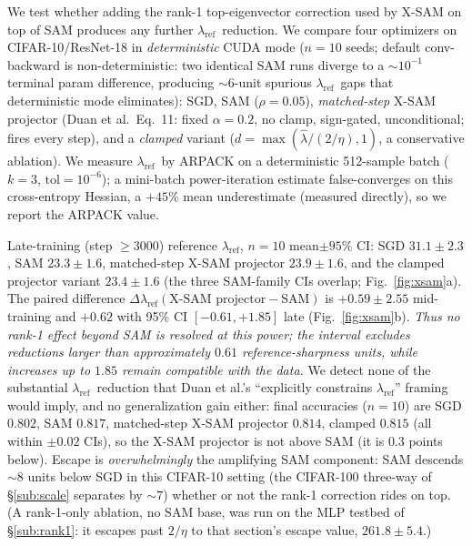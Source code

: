 \documentclass{article}
\theoremstyle{plain}
\theoremstyle{definition}
\theoremstyle{remark}
\newcommand{\lref}{\ensuremath{\lambda_{\mathrm{ref}}}}
\begin{document}
We test whether adding the rank-1 top-eigenvector correction used by X-SAM
\citep{duan2026xsam} on top of SAM produces any further \lref\
reduction. We compare four optimizers on CIFAR-10/ResNet-18 in
\emph{deterministic} CUDA mode ($n{=}10$ seeds; default conv-backward is
non-deterministic: two identical SAM runs diverge to a $\sim\!10^{-1}$
terminal param difference, producing $\sim\!6$-unit spurious \lref\ gaps
that deterministic mode eliminates): SGD, SAM ($\rho{=}0.05$),
\emph{matched-step} X-SAM projector (Duan et al.\ Eq.~11: fixed $\alpha{=}0.2$, no
clamp, sign-gated, unconditional; fires every step), and a \emph{clamped}
variant ($d=\max(\hat\lambda/(2/\eta),1)$, a conservative ablation). We
measure \lref\ by ARPACK on a deterministic 512-sample batch ($k{=}3$,
$\mathrm{tol}{=}10^{-6}$); a mini-batch power-iteration estimate
false-converges on this cross-entropy Hessian, a $+45\%$ mean
underestimate (measured directly), so we report the ARPACK value.

Late-training (step $\geq 3000$) reference \lref, $n{=}10$ mean$\pm 95\%$ CI:
SGD $31.1\pm2.3$, SAM $23.3\pm1.6$, matched-step X-SAM projector
$23.9\pm1.6$, and the clamped projector variant $23.4\pm1.6$ (the three
SAM-family CIs overlap; Fig.~\ref{fig:xsam}a). The paired difference
$\Delta\lref(\text{X-SAM projector}-\text{SAM})$ is $+0.59\pm2.55$
mid-training and $+0.62$ with 95\% CI $[-0.61,+1.85]$ late
(Fig.~\ref{fig:xsam}b). \emph{Thus
no rank-1 effect beyond SAM is resolved at this power; the interval
excludes reductions larger than approximately $0.61$ reference-sharpness
units, while increases up to $1.85$ remain compatible with the data.} We detect none of the substantial \lref\ reduction that Duan
et al.'s ``explicitly constrains \lref'' framing would imply, and no
generalization gain either: final accuracies ($n{=}10$) are SGD $0.802$,
SAM $0.817$, matched-step X-SAM projector $0.814$, clamped $0.815$ (all within
$\pm0.02$ CIs), so the X-SAM projector is not above SAM (it is $0.3$ points below).
Escape is \emph{overwhelmingly} the amplifying SAM component: SAM descends
$\sim\!8$ units below SGD in this CIFAR-10 setting (the CIFAR-100 three-way
of \S\ref{sub:scale} separates by $\sim\!7$) whether or not the rank-1
correction rides on top. (A rank-1-only ablation, no SAM base, was run on
the MLP testbed of \S\ref{sub:rank1}: it escapes past $2/\eta$ to that
section's escape value, $261.8\pm5.4$.)
\end{document}

